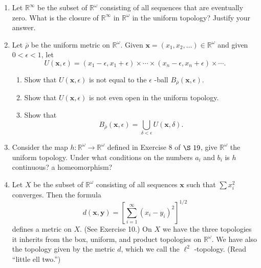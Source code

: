 \begin{enumerate}[itemsep=0.4em, parsep=0pt, topsep=0pt, partopsep=0pt, leftmargin=*, label=\arabic*., ref=\arabic*]
\begin{enumerate}[itemsep=0.2em, parsep=0pt, topsep=0pt, partopsep=0pt, leftmargin=*, label=(\alph*), align=left]
  \item In which topologies do the following sequences converge? \[ \mathbf{w}_{1} = ( {1,1,1,1,\ldots }),\;\mathbf{x}_{1} = ( {1,1,1,1,\ldots }), \] \[ \mathbf{w}_{2} = ( {0,2,2,2,\ldots }),\;\mathbf{x}_{2} = ( {0,\frac{1}{2},\frac{1}{2},\frac{1}{2},\ldots }), \] \[ \mathbf{w}_{3} = ( {0,0,3,3,\ldots }),\;\mathbf{x}_{3} = ( {0,0,\frac{1}{3},\frac{1}{3}\ldots }), \] ... ... \[ \mathbf{y}_{1} = ( {1,0,0,0,\ldots }),\;\mathbf{z}_{1} = ( {1,1,0,0,\ldots }), \] \[ \mathbf{y}_{2} = ( {\frac{1}{2},\frac{1}{2},0,0,\ldots }),\;\mathbf{z}_{2} = ( {\frac{1}{2},\frac{1}{2},0,0,\ldots }), \] \[ \mathbf{y}_{3} = ( {\frac{1}{3},\frac{1}{3},\frac{1}{3},0,\ldots }),\;\mathbf{z}_{3} = ( {\frac{1}{3},\frac{1}{3},0,0,\ldots }), \] ... ...
  \end{enumerate}
\item Let \(\mathbb{R}^{\infty }\) be the subset of \(\mathbb{R}^{\omega }\) consisting of all sequences that are eventually zero. What is the closure of \(\mathbb{R}^{\infty }\) in \(\mathbb{R}^{\omega }\) in the uniform topology? Justify your answer.
\item Let \(\bar{\rho }\) be the uniform metric on \(\mathbb{R}^{\omega }\). Given \(\mathbf{x} = ( {x_{1},x_{2},\ldots }) \in {\mathbb{R}}^{\omega }\) and given \(0 < \epsilon < 1\), let \[ U( {\mathbf{x},\epsilon }) = ( {x_{1} - \epsilon,x_{1} + \epsilon }) \times \cdots \times ( {x_{n} - \epsilon,x_{n} + \epsilon }) \times \cdots . \]
  \begin{enumerate}[itemsep=0.2em, parsep=0pt, topsep=0pt, partopsep=0pt, leftmargin=*, label=(\alph*), align=left]
  \item Show that \(U( {\mathbf{x},\epsilon })\) is not equal to the \(\epsilon\) -ball \(B_{\bar{\rho }}( {\mathbf{x},\epsilon })\).
  \item Show that \(U( {\mathbf{x},\epsilon })\) is not even open in the uniform topology.
  \item Show that \[ B_{\bar{\rho }}( {\mathbf{x},\epsilon }) = \mathop{\bigcup }\limits_{{\delta < \epsilon }}U( {\mathbf{x},\delta }). \]
  \end{enumerate}
\item Consider the map \(h : \mathbb{R}^{\omega } \rightarrow {\mathbb{R}}^{\omega }\) defined in Exercise 8 of \(\S\ {19}\), give \(\mathbb{R}^{\omega }\) the uniform topology. Under what conditions on the numbers \(a_{i}\) and \(b_{i}\) is \(h\) continuous? a homeomorphism?
\item Let \(X\) be the subset of \(\mathbb{R}^{\omega }\) consisting of all sequences \(\mathbf{x}\) such that \(\sum {x}_i^{2}\) converges. Then the formula \[ d( {\mathbf{x},\mathbf{y}}) = {[ \mathop{\sum }\limits_{{i = 1}}^{\infty }{( x_{i} - y_{i}) }^{2}] }^{1/2} \] defines a metric on \(X\). (See Exercise 10.) On \(X\) we have the three topologies it inherits from the box, uniform, and product topologies on \(\mathbb{R}^{\omega }\). We have also the topology given by the metric \(d\), which we call the \({\ell }^{2}\) -topology. (Read ``little ell two.'')

\end{enumerate}
